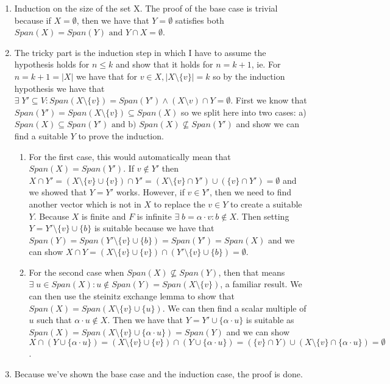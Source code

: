 \documentclass{article}
\begin{document}
\begin{enumerate}
    \item Induction on the size of the set X. The proof of the base case is trivial because if \(X = \emptyset\), then we have that \(Y = \emptyset\) satisfies both \(Span(X) = Span(Y) \text{ and } Y\cap X = \emptyset\).
    \item The tricky part is the induction step in which I have to assume the hypothesis holds for \(n\leq k\) and show that it holds for \(n = k + 1\), ie. For \(n = k+ 1 = |X|\) we have that for \(v \in X, |X\setminus\{v\}| = k\) so by the induction hypothesis we have that \(\exists\;Y' \subseteq V:Span(X\setminus\{v\}) = Span(Y') \land (X\setminus{v})\cap Y = \emptyset\). First we know that \(Span(Y') = Span(X\setminus\{v\}) \subseteq Span(X)\) so we split here into two cases: a) \(Span(X) \subseteq Span(Y') \text{ and b) } Span(X) \not\subseteq Span(Y') \) and show we can find a suitable \(Y\) to prove the induction.

    \begin{enumerate}
        \item For the first case, this would automatically mean that \(Span(X) = Span(Y')\). If \(v \notin Y'\) then \(X\cap Y' = (X\setminus\{v\} \cup \{v\})\cap Y' = (X\setminus\{v\} \cap Y') \cup (\{v\}\cap Y') = \emptyset\) and we showed that \(Y = Y'\) works. However, if \(v \in Y'\), then we need to find another vector which is not in $X$ to replace the \(v \in Y\) to create a suitable \(Y\). Because \(X\) is finite and \(F\) is infinite \( \exists\; b = \alpha \cdot v : b \notin X\). Then setting \(Y = Y'\setminus \{v\} \cup \{b\}\) is suitable because we have that \(Span(Y) = Span(Y'\setminus \{v\} \cup \{b\})= Span(Y') = Span(X)\) and we can show \(X \cap Y = (X\setminus\{v\} \cup \{v\}) \cap (Y'\setminus \{v\} \cup \{b\})  = \emptyset\).

        \item For the second case when \(Span(X) \not\subseteq Span(Y)\), then that means \(\exists\;u \in Span(X) : u \notin Span(Y) = Span(X\setminus \{v\})\), a familiar result. We can then use the steinitz exchange lemma to show that \(Span(X) = Span(X\setminus \{v\} \cup \{u\})\). We can then find a scalar multiple of \(u\) such that \(\alpha \cdot u \notin X\). Then we have that \(Y = Y' \cup \{\alpha \cdot u\}\) is suitable as \(Span(X) = Span(X\setminus \{v\} \cup \{\alpha \cdot u\}) = Span(Y)\) and we can show \(X \cap (Y \cup \{\alpha \cdot u\}) = (X\setminus\{v\} \cup \{v\})\cap (Y \cup \{\alpha \cdot u\}) = (\{v\} \cap Y) \cup ( X\setminus\{v\} \cap \{\alpha \cdot u\})  = \emptyset\).
    \end{enumerate}
    \item Because we've shown the base case and the induction case, the proof is done.
\end{enumerate}
\end{document}
